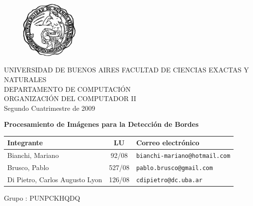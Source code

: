 \documentclass[11pt, a4paper]{article}
\begin{document}
\begin{figure}[t] %
\centering
\includegraphics[width=80pt]{./logo.jpg}
\end{figure}


\begin{center}


\LARGE{UNIVERSIDAD DE BUENOS AIRES}
\Large{FACULTAD DE CIENCIAS EXACTAS Y NATURALES\\
DEPARTAMENTO DE COMPUTACI\'ON\\
\vspace{1.5cm}
ORGANIZACI\'ON DEL COMPUTADOR II\\
Segundo Cuatrimestre de 2009}

\vskip 50pt
\textbf{\Large{Procesamiento de Im\'agenes para la Detecci\'on de Bordes}}

\end{center}

\vskip 30pt

\begin{center}
\begin{tabular}{|lcl|}
\hline Integrante & LU & Correo electr\'onico \\
\hline Bianchi, Mariano & 92/08 & \texttt{bianchi-mariano@hotmail.com}\\
Brusco, Pablo & 527/08 & \texttt{pablo.brusco@gmail.com} \\
Di Pietro, Carlos Augusto Lyon & 126/08 & \texttt{cdipietro@dc.uba.ar}\\
\hline
\end{tabular}

\vspace{20 pt}

Grupo : PUNPCKHQDQ

\end{center}

\vskip 60pt
\end{document}
